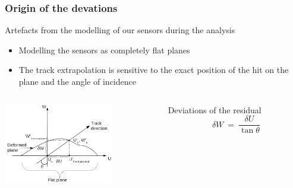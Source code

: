 \documentclass{beamer}
\begin{document}
\begin{frame}
  \frametitle{Origin of the devations}
  
  \begin{block}{Artefacts from the modelling of our sensors during the analysis}
    \begin{itemize}
      \item Modelling the sensors as completely flat planes
      \item The track extrapolation is sensitive to the exact position of the hit on the plane and the angle of incidence
    \end{itemize}
  \end{block}

  \begin{columns}[c]
    \begin{column}{5cm}
      \vspace{-0.2cm}
      \begin{center}
        \includegraphics[width = 4.8cm]{Pictures/origin_deformation.png}
      \end{center}
    \end{column}

    \begin{column}{5cm}
      \begin{alertblock}{Deviations of the residual}
        \[ \delta W \ = \ \frac{\delta U}{\tan \theta}\]
      \end{alertblock}
    \end{column}
  \end{columns}

\end{frame}
\end{document}
